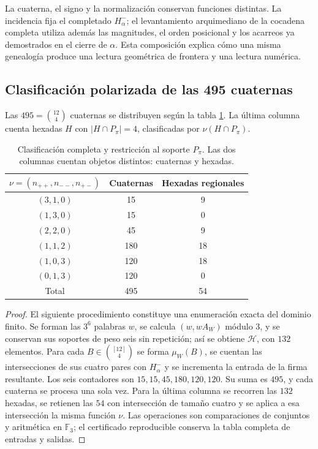 La cuaterna, el signo y la normalización conservan funciones distintas.
La incidencia fija el completado \(H^-_\alpha\); el levantamiento
arquimediano de la cocadena completa utiliza además las magnitudes,
el orden posicional y los acarreos ya demostrados en el cierre de
\(\alpha\). Esta composición explica cómo una misma genealogía
produce una lectura geométrica de frontera y una lectura numérica.

\subsection{Clasificación polarizada de las 495 cuaternas}
\label{star27:clasificacion}

\begin{theorem}
\label{star27:censo}
Las \(495=\binom{12}{4}\) cuaternas se distribuyen según la tabla
\ref{star27:tabla-censo}. La última columna cuenta hexadas
\(H\) con \(|H\cap P_\pi|=4\), clasificadas por
\(\nu(H\cap P_\pi)\).
\end{theorem}

\begin{table}[htbp]
\centering
\begin{tabular}{ccc}
\toprule
\(\nu=(n_{++},n_{--},n_{+-})\)&Cuaternas&Hexadas regionales\\
\midrule
\((3,1,0)\)&15&9\\
\((1,3,0)\)&15&0\\
\((2,2,0)\)&45&9\\
\((1,1,2)\)&180&18\\
\((1,0,3)\)&120&18\\
\((0,1,3)\)&120&0\\
\midrule
Total&495&54\\
\bottomrule
\end{tabular}
\caption{Clasificación completa y restricción al soporte \(P_\pi\).
Las dos columnas cuentan objetos distintos: cuaternas y hexadas.}
\label{star27:tabla-censo}
\end{table}

\begin{proof}
El siguiente procedimiento constituye una enumeración exacta del
dominio finito. Se forman las \(3^6\) palabras \(w\), se calcula
\((w,wA_W)\) módulo \(3\), y se conservan sus soportes de peso seis
sin repetición; así se obtiene \(\mathcal H\), con \(132\) elementos.
Para cada \(B\in\binom{[12]}4\) se forma \(\mu_W(B)\), se cuentan
las intersecciones de sus cuatro pares con \(H^-_\alpha\) y se
incrementa la entrada de la firma resultante. Los seis contadores
son \(15,15,45,180,120,120\). Su suma es \(495\), y cada cuaterna
se procesa una sola vez. Para la última columna se recorren las
\(132\) hexadas, se retienen las \(54\) con intersección de tamaño
cuatro y se aplica a esa intersección la misma función \(\nu\).
Las operaciones son comparaciones de conjuntos y aritmética en
\(\mathbb F_3\); el certificado reproducible conserva la tabla
completa de entradas y salidas.
\end{proof}

